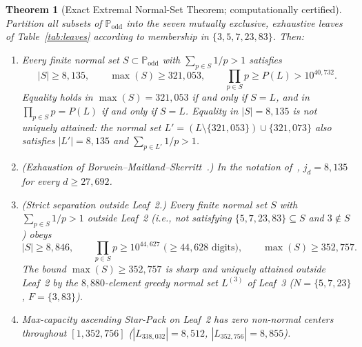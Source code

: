 \documentclass[11pt]{article}
\newtheorem{theorem}{Theorem}[section]
\theoremstyle{remark}
\newcommand{\Podd}{\mathbb{P}_{\mathrm{odd}}}
\begin{document}
\begin{theorem}[Exact Extremal Normal-Set Theorem; computationally certified]
\label{thm:extremal}
Partition all subsets of $\Podd$ into the seven mutually exclusive, exhaustive
leaves of Table~\ref{tab:leaves} according to membership in $\{3,5,7,23,83\}$.
Then:
\begin{enumerate}
  \item Every finite normal set $S \subset \Podd$ with $\sum_{p\in S} 1/p > 1$
  satisfies
  \[
    |S| \ge 8{,}135,
    \qquad
    \max(S) \ge 321{,}053,
    \qquad
    \prod_{p\in S} p \ge P(L) > 10^{40{,}732}.
  \]
  Equality holds in $\max(S) = 321{,}053$ if and only if $S = L$, and in
  $\prod_{p\in S} p = P(L)$ if and only if $S = L$. Equality in $|S| = 8{,}135$
  is \emph{not} uniquely attained: the normal set
  $L' = (L \setminus \{321{,}053\}) \cup \{321{,}073\}$ also satisfies
  $|L'| = 8{,}135$ and $\sum_{p\in L'} 1/p > 1$.
  \item \emph{(Exhaustion of Borwein--Maitland--Skerritt~\cite{DBLP:journals/int/BorweinMS13}.)}
  In the notation of~\cite[Definition~7]{DBLP:journals/int/BorweinMS13},
  $j_d = 8{,}135$ for every $d \ge 27{,}692$.
  \item \emph{(Strict separation outside Leaf~2.)} Every finite normal set $S$
  with $\sum_{p\in S} 1/p > 1$ outside Leaf~2 (i.e., not satisfying
  $\{5,7,23,83\}\subseteq S$ and $3\notin S$) obeys
  \[
    |S| \ge 8{,}846,
    \qquad
    \prod_{p\in S} p \ge 10^{44{,}627} \text{ ($\ge 44{,}628$ digits)},
    \qquad
    \max(S) \ge 352{,}757.
  \]
  The bound $\max(S) \ge 352{,}757$ is sharp and uniquely attained outside
  Leaf~2 by the $8{,}880$-element greedy normal set $L^{(3)}$ of Leaf~3
  ($N=\{5,7,23\}$, $F=\{3,83\}$).
  \item Max-capacity ascending Star-Pack on Leaf~2 has zero non-normal centers
  throughout $[1, 352{,}756]$ ($|L_{338,032}| = 8{,}512$,
  $|L_{352,756}| = 8{,}855$).
\end{enumerate}
\end{theorem}
\end{document}
